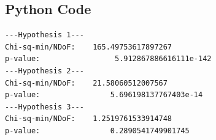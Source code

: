 \documentclass[a4paper]{article}
\begin{document}
\begin{appendix}
\section{Python Code}\label{sec:python}
%
\begin{verbatim}
---Hypothesis 1---
Chi-sq-min/NDoF:	165.49753617897267
p-value:				 5.912867886616111e-142
---Hypothesis 2---
Chi-sq-min/NDoF:	21.58060512007567
p-value:				5.696198137767403e-14
---Hypothesis 3---
Chi-sq-min/NDoF:	1.2519761533914748
p-value:				0.2890541749901745
\end{verbatim}
\end{appendix}
\end{document}
